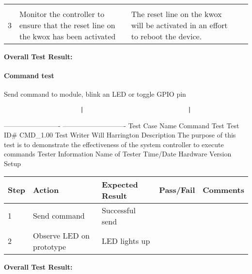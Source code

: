 \documentclass[]{article}
\let\oldparagraph\paragraph
\renewcommand{\paragraph}[1]{\oldparagraph{#1}\mbox{}}
\begin{document}
\begin{longtable}[c]{@{}lllll@{}}
\begin{minipage}[t]{0.12\columnwidth}
\strut\end{minipage} &
\begin{minipage}[t]{0.11\columnwidth}\raggedright\strut
\strut\end{minipage}\tabularnewline
\begin{minipage}[t]{0.06\columnwidth}\raggedright\strut
3
\strut\end{minipage} &
\begin{minipage}[t]{0.08\columnwidth}\raggedright\strut
Monitor the controller to ensure that the reset line on the kwox has
been activated
\strut\end{minipage} &
\begin{minipage}[t]{0.19\columnwidth}\raggedright\strut
The reset line on the kwox will be activated in an effort to reboot the
device.
\strut\end{minipage} &
\begin{minipage}[t]{0.12\columnwidth}\raggedright\strut
\strut\end{minipage} &
\begin{minipage}[t]{0.11\columnwidth}\raggedright\strut
\strut\end{minipage}\tabularnewline
\bottomrule
\end{longtable}

\textbf{Overall Test Result:}

\paragraph{Command test}\label{command-test}

Send command to module, blink an LED or toggle GPIO pin

\begin{verbatim}
                      |                              |
\end{verbatim}

------------------------- \textbar{} ----------------------------
\textbar{} Test Case Name \textbar{} Command Test \textbar{} Test ID\#
\textbar{} CMD\_1.00 \textbar{} Test Writer \textbar{} Will Harrington
\textbar{} Description \textbar{} The purpose of this test is to
demonstrate the effectiveness of the system controller to execute
commands \textbar{} Tester Information \textbar{} \textbar{} Name of
Tester \textbar{} \textbar{} Time/Date \textbar{} \textbar{} Hardware
Version \textbar{} \textbar{} Setup \textbar{} \textbar{}

\begin{longtable}[c]{@{}lllll@{}}
\toprule
Step & Action & Expected Result & Pass/Fail & Comments\tabularnewline
\midrule
\endhead
1 & Send command & Successful send & &\tabularnewline
2 & Observe LED on prototype & LED lights up & &\tabularnewline
\bottomrule
\end{longtable}

\textbf{Overall Test Result:}
\end{document}

